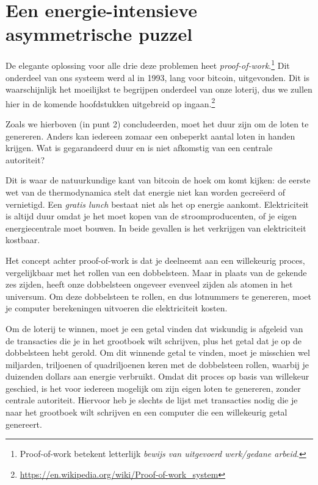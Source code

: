 \documentclass[
  letterpaper,
]{scrbook}
\begin{document}
\hypertarget{een-energie-intensieve-asymmetrische-puzzel}{%
\section{Een energie-intensieve asymmetrische
puzzel}\label{een-energie-intensieve-asymmetrische-puzzel}}

De elegante oplossing voor alle drie deze problemen heet
\emph{proof-of-work}.\footnote{Proof-of-work betekent letterlijk
  \emph{bewijs van uitgevoerd werk/gedane arbeid}.} Dit onderdeel van
ons systeem werd al in 1993, lang voor bitcoin, uitgevonden. Dit is
waarschijnlijk het moeilijkst te begrijpen onderdeel van onze loterij,
dus we zullen hier in de komende hoofdstukken uitgebreid op
ingaan.\footnote{\url{https://en.wikipedia.org/wiki/Proof-of-work_system}}

Zoals we hierboven (in punt 2) concludeerden, moet het duur zijn om de
loten te genereren. Anders kan iedereen zomaar een onbeperkt aantal
loten in handen krijgen. Wat is gegarandeerd duur en is niet afkomstig
van een centrale autoriteit?

Dit is waar de natuurkundige kant van bitcoin de hoek om komt kijken: de
eerste wet van de thermodynamica stelt dat energie niet kan worden
gecreëerd of vernietigd. Een \emph{gratis lunch} bestaat niet als het op
energie aankomt. Elektriciteit is altijd duur omdat je het moet kopen
van de stroomproducenten, of je eigen energiecentrale moet bouwen. In
beide gevallen is het verkrijgen van elektriciteit kostbaar.

Het concept achter proof-of-work is dat je deelneemt aan een willekeurig
proces, vergelijkbaar met het rollen van een dobbelsteen. Maar in plaats
van de gekende zes zijden, heeft onze dobbelsteen ongeveer evenveel
zijden als atomen in het universum. Om deze dobbelsteen te rollen, en
dus lotnummers te genereren, moet je computer berekeningen uitvoeren die
elektriciteit kosten.

Om de loterij te winnen, moet je een getal vinden dat wiskundig is
afgeleid van de transacties die je in het grootboek wilt schrijven, plus
het getal dat je op de dobbelsteen hebt gerold. Om dit winnende getal te
vinden, moet je misschien wel miljarden, triljoenen of quadriljoenen
keren met de dobbelsteen rollen, waarbij je duizenden dollars aan
energie verbruikt. Omdat dit proces op basis van willekeur geschied, is
het voor iedereen mogelijk om zijn eigen loten te genereren, zonder
centrale autoriteit. Hiervoor heb je slechts de lijst met transacties
nodig die je naar het grootboek wilt schrijven en een computer die een
willekeurig getal genereert.
\end{document}
